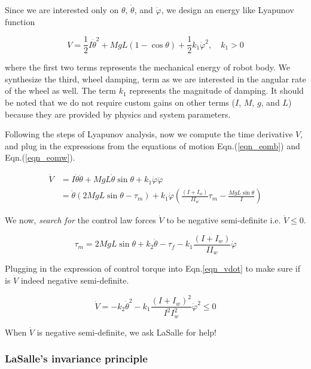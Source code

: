 \documentclass{article}
\begin{document}
Since we are interested only on $\theta$,  $\dot{\theta}$, and $\dot{\varphi}$, we design an energy like Lyapunov function

\begin{equation}
  V = \frac{1}{2} I \dot{\theta}^2 + MgL (1 - \cos\theta) + \frac{1}{2} k_1 \dot{\varphi}^2, \quad k_1 > 0
\end{equation}

where the first two terms represents the mechanical energy of robot body. We synthesize the third, wheel damping, term as we are interested in the angular rate of the wheel as well. The term $k_{1}$ represents the magnitude of damping. It should be noted that we do not require custom gains on other terms ($I$, $M$, $g$, and $L$) because they are provided by physics and system parameters.

Following the steps of Lyapunov analysis, now we compute the time derivative $V$, and plug in the expressions from the equations of motion Eqn.(\ref{eqn_eomb}) and Eqn.(\ref{eqn_eomw}).

\begin{align}
  \dot{V} &= I \dot{\theta} \ddot{\theta} + MgL \dot{\theta} \sin\theta + k_1 \dot{\varphi} \ddot{\varphi} \nonumber \\
          &= \dot{\theta}(2MgL \sin\theta - \tau_m) + k_1 \dot{\varphi}\left(\frac{(I + I_w)}{I I_w}\tau_m - \frac{MgL \sin\theta}{I}\right)
  \label{eqn_vdot}
\end{align}

We now, \textit{search for} the control law forces $\dot{V}$ to be negative semi-definite i.e. $\dot{V}\leq0$.

\begin{equation}
  \tau_m = 2MgL \sin\theta + k_2 \dot{\theta} - \tau_{f}- k_1 \frac{(I + I_w)}{I I_w} \dot{\varphi}
  \label{eqn_ctrl}
\end{equation}

Plugging in the expression of control torque into Eqn.{\ref{eqn_vdot}} to make sure if is $\dot{V}$ indeed negative semi-definite.

\begin{equation}
  \dot{V} = -k_2 \dot{\theta}^2 - k_1 \frac{(I + I_w)^2}{I^2 I_w^2} \dot{\varphi}^2 \leq 0
\end{equation}

When $\dot{V}$ is negative semi-definite, we ask LaSalle for help!

\subsubsection*{LaSalle's invariance principle}
\end{document}
